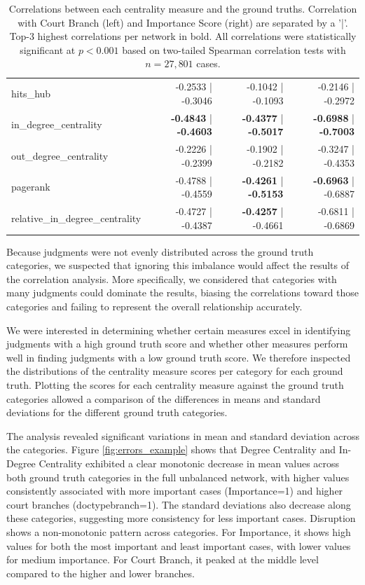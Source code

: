 \documentclass[sigconf,authordraft]{acmart}
\begin{document}
\begin{table}[t]
\begin{tabular}{@{}p{4cm} r r r@{}}
hits\_hub                         &           -0.2533 | -0.3046 &           -0.1042 | -0.1093 &           -0.2146 | -0.2972   \\
in\_degree\_centrality             &  \textbf{-0.4843} | \textbf{-0.4603} &  \textbf{-0.4377} | \textbf{-0.5017} &  \textbf{-0.6988} | \textbf{-0.7003}   \\
out\_degree\_centrality            &           -0.2226 | -0.2399 &           -0.1902 | -0.2182 &           -0.3247 | -0.4353   \\
pagerank                         &           -0.4788 | -0.4559 &  \textbf{-0.4261} | \textbf{-0.5153} &           \textbf{-0.6963} | -0.6887   \\
relative\_in\_degree\_centrality    &           -0.4727 | -0.4387 &           \textbf{-0.4257} | -0.4661 &           -0.6811 | -0.6869   \\
\bottomrule
\end{tabular}
\caption{Correlations between each centrality measure and the ground truths.
Correlation with Court Branch (left) and Importance Score (right) are separated
by a '|'. Top-3 highest correlations per network in bold. All correlations were
statistically significant at $p < 0.001$ based on two-tailed Spearman
correlation tests with $n=27{,}801$ cases.}
\label{tab:correlations_centr_groundtruths}
\end{table}


Because judgments were not evenly distributed across the ground truth categories, we suspected that ignoring this imbalance would affect the results of the correlation analysis. More specifically, we considered that categories with many judgments could dominate the results, biasing the correlations toward those categories and failing to represent the overall relationship accurately.

We were interested in determining whether certain measures excel in identifying judgments with a high ground truth score and whether other measures perform well in finding judgments with a low ground truth score. We therefore inspected the distributions of the centrality measure scores per category for each ground truth. Plotting the scores for each centrality measure against the ground truth categories allowed a comparison of the differences in means and standard deviations for the different ground truth categories.

The analysis revealed significant variations in mean and standard deviation across the categories. Figure \ref{fig:errors_example} shows that Degree Centrality and In-Degree Centrality exhibited a clear monotonic decrease in mean values across both ground truth categories in the full unbalanced network, with higher values consistently associated with more important cases (Importance=1) and higher court branches (doctypebranch=1). The standard deviations also decrease along these categories, suggesting more consistency for less important cases.
Disruption shows a non-monotonic pattern across categories. For Importance, it shows high values for both the most important and least important cases, with lower values for medium importance. For Court Branch, it peaked at the middle level compared to the higher and lower branches.
\end{document}
